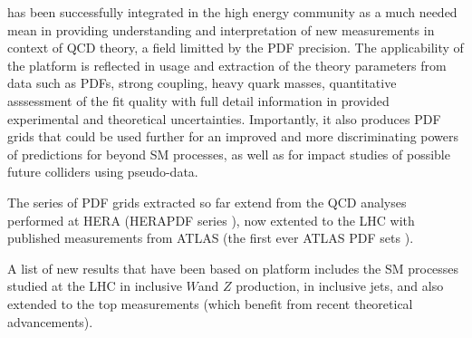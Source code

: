 \fitter has been successfully integrated in the high energy community as a much needed mean in providing understanding and interpretation of new measurements in context of QCD theory, a field limitted by the PDF precision.  
The applicability of the \fitter platform is reflected in usage and extraction of the theory parameters from data such as PDFs, strong coupling, heavy quark masses, quantitative asssessment of the fit quality with full detail information in provided experimental and theoretical uncertainties.
Importantly, it also produces PDF grids that could be used further for an improved and more discriminating powers of predictions for beyond SM processes, as well as for impact studies of possible future colliders using pseudo-data.

The series of PDF grids extracted so far extend from the QCD analyses performed at HERA (HERAPDF series \cite{HERAPDFs}), now extented to the LHC with published measurements from ATLAS (the first ever ATLAS PDF sets \cite{ATLASgrids}).

A list of new results that have been based on \fitter  platform includes the SM processes studied at the LHC in inclusive  $W$and $Z$ production, in inclusive jets, and also extended to the top measurements (which benefit from recent theoretical advancements).

